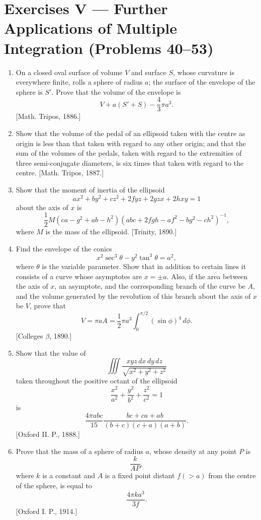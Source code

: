 \documentclass[11pt, a4paper]{article}
\newcommand{\source}[1]{\hfill\textnormal{[#1]}}
\begin{document}
\section*{Exercises V --- Further Applications of Multiple Integration (Problems 40--53)}

\begin{enumerate}[leftmargin=2em]

\item[40.] On a closed oval surface of volume $V$ and surface $S$, whose curvature is everywhere finite, rolls a sphere of radius $a$; the surface of the envelope of the sphere is $S'$. Prove that the volume of the envelope is
\[
V+a(S'+S)-\frac{4}{3}\pi a^3.
\]
\source{Math. Tripos, 1886.}

\item[41.] Show that the volume of the pedal of an ellipsoid taken with the centre as origin is less than that taken with regard to any other origin; and that the sum of the volumes of the pedals, taken with regard to the extremities of three semi-conjugate diameters, is six times that taken with regard to the centre.
\source{Math. Tripos, 1887.}

\item[42.] Show that the moment of inertia of the ellipsoid
\[
ax^2+by^2+cz^2+2fyz+2gzx+2hxy=1
\]
about the axis of $x$ is
\[
\frac12M
(ca-g^2+ab-h^2)
(abc+2fgh-af^2-bg^2-ch^2)^{-1},
\]
where $M$ is the mass of the ellipsoid.
\source{Trinity, 1890.}

\item[43.] Find the envelope of the conics
\[
x^2\sec^3\theta-y^2\tan^3\theta=a^2,
\]
where $\theta$ is the variable parameter. Show that in addition to certain lines it consists of a curve whose asymptotes are $x=\pm a$. Also, if the area between the axis of $x$, an asymptote, and the corresponding branch of the curve be $A$, and the volume generated by the revolution of this branch about the axis of $x$ be $V$, prove that
\[
V=\pi aA=\frac12\pi a^3\int_0^{\pi/2}(\sin\phi)^4\,d\phi.
\]
\source{Colleges $\beta$, 1890.}

\item[44.] Show that the value of
\[
\iiint\frac{xyz\,dx\,dy\,dz}{\sqrt{x^2+y^2+z^2}}
\]
taken throughout the positive octant of the ellipsoid
\[
\frac{x^2}{a^2}+\frac{y^2}{b^2}+\frac{z^2}{c^2}=1
\]
is
\[
\frac{4\pi abc}{15}
\frac{bc+ca+ab}{(b+c)(c+a)(a+b)}.
\]
\source{Oxford II. P., 1888.}

\item[45.] Prove that the mass of a sphere of radius $a$, whose density at any point $P$ is
\[
\frac{k}{AP},
\]
where $k$ is a constant and $A$ is a fixed point distant $f(>a)$ from the centre of the sphere, is equal to
\[
\frac{4\pi ka^3}{3f}.
\]
\source{Oxford I. P., 1914.}


\end{enumerate}
\end{document}
